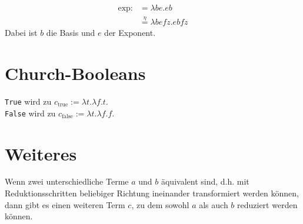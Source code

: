 \begin{beispiel}[Potenz]
    \begin{align*}
     \text{exp} :&= \lambda b e. eb\\
                   &\overset{\eta}{=} \lambda b e f z. e b f z
    \end{align*}
    Dabei ist $b$ die Basis und $e$ der Exponent.
\end{beispiel}

\section{Church-Booleans}
\begin{definition}%
    \texttt{True} wird zu $c_{\text{true}} := \lambda t. \lambda f. t$.\\
    \texttt{False} wird zu $c_{\text{false}} := \lambda t. \lambda f. f$.
\end{definition}

\section{Weiteres}
\begin{satz}
    Wenn zwei unterschiedliche Terme $a$ und $b$ äquivalent sind, d.h. mit Reduktionsschritten beliebiger Richtung ineinander transformiert werden können, dann gibt es einen weiteren Term $c$, zu dem sowohl $a$ als auch $b$ reduziert werden können.
\end{satz}